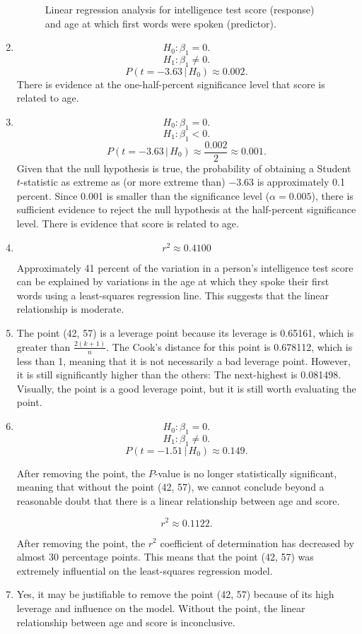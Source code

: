 \documentclass[12pt]{article}
\begin{document}
\begin{enumerate}
\begin{figure}[!h]
\begin{center}
\end{center}
\caption{Linear regression analysis for intelligence test score (response) and age at which first words were spoken (predictor).\label{fig:scoreageregression}}
\end{figure}
\item
\[H_0:\beta_1=0.\]
\[H_1:\beta_1\neq 0.\]
\[P(t=-3.63\,|\,H_0)\approx0.002.\]
There is evidence at the one-half-percent significance level that score is related to age.
\item
\[H_0:\beta_1=0.\]
\[H_1:\beta_1<0.\]
\[P(t=-3.63\,|\,H_0)\approx\frac{0.002}{2}\approx 0.001.\]
Given that the null hypothesis is true, the probability of obtaining a Student $t$-statistic as extreme as (or more extreme than) $-3.63$ is approximately 0.1 percent. Since 0.001 is smaller than the significance level ($\alpha=0.005$), there is sufficient evidence to reject the null hypothesis at the half-percent significance level. There is evidence that score is related to age.
\item \[r^2\approx 0.4100\]

Approximately 41 percent of the variation in a person's intelligence test score can be explained by variations in the age at which they spoke their first words using a least-squares regression line. This suggests that the linear relationship is moderate.
\item The point (42, 57) is a leverage point because its leverage is 0.65161, which is greater than $\frac{2(k+1)}{n}$. The Cook's distance for this point is 0.678112, which is less than 1, meaning that it is not necessarily a bad leverage point. However, it is still significantly higher than the others: The next-highest is 0.081498. Visually, the point is a good leverage point, but it is still worth evaluating the point.
\item 
\[H_0:\beta_1=0.\]
\[H_1:\beta_1\neq 0.\]
\[P(t=-1.51\,|\,H_0)\approx 0.149.\]

After removing the point, the $P$-value is no longer statistically significant, meaning that without the point (42, 57), we cannot conclude beyond a reasonable doubt that there is a linear relationship between age and score.

\[r^2\approx 0.1122.\]

After removing the point, the $r^2$ coefficient of determination has decreased by almost 30 percentage points. This means that the point (42, 57) was extremely influential on the least-squares regression model.
\item Yes, it may be justifiable to remove the point (42, 57) because of its high leverage and influence on the model. Without the point, the linear relationship between age and score is inconclusive.
\end{enumerate}
\end{document}
